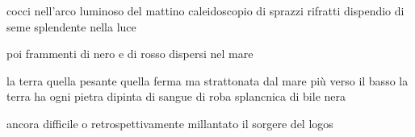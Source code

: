 \clearpage


\begin{poem}
	\begin{stanza}
		cocci nell’arco luminoso del mattino\verseline
		caleidoscopio di sprazzi rifratti\verseline
		dispendio di seme splendente nella luce
	\end{stanza}

	\begin{stanza}
		poi frammenti di nero e di rosso\verseline
		dispersi nel mare
	\end{stanza}

	\begin{stanza}
		la terra\verseline
		quella pesante\verseline
		quella ferma\verseline
		ma strattonata dal mare\verseline
		più verso il basso\verseline
		la terra\verseline
		ha ogni pietra dipinta di sangue\verseline
		di roba\verseline
		splancnica\verseline
		di bile nera
	\end{stanza}

	\begin{stanza}
		ancora difficile o retrospettivamente\verseline
		millantato\verseline
		il sorgere del logos
	\end{stanza}
\end{poem}

\clearpage



